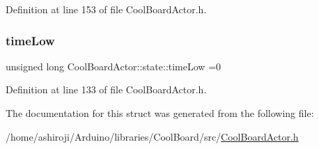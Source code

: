 Definition at line 153 of file Cool\+Board\+Actor.\+h.

\mbox{\label{struct_cool_board_actor_1_1state_a314c53c146e8c7b12c025323a34fbb9a}} 
\subsubsection{\texorpdfstring{time\+Low}{timeLow}}
{\footnotesize\ttfamily unsigned long Cool\+Board\+Actor\+::state\+::time\+Low =0}



Definition at line 133 of file Cool\+Board\+Actor.\+h.



The documentation for this struct was generated from the following file\+:\begin{DoxyCompactItemize}
\item 
/home/ashiroji/\+Arduino/libraries/\+Cool\+Board/src/\hyperlink{_cool_board_actor_8h}{Cool\+Board\+Actor.\+h}\end{DoxyCompactItemize}
